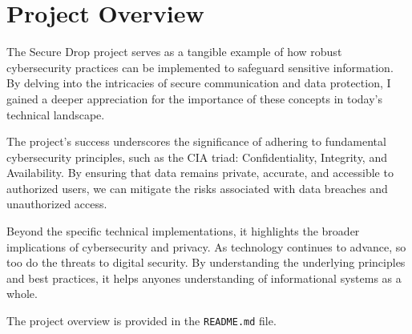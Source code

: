 \documentclass[12pt]{article}
\begin{document}
\newpage

\section{Project Overview}

The Secure Drop project serves as a tangible example of how robust cybersecurity practices can be implemented to safeguard sensitive information. By delving into the intricacies of secure communication and data protection, I gained a deeper appreciation for the importance of these concepts in today's technical landscape.

The project's success underscores the significance of adhering to fundamental cybersecurity principles, such as the CIA triad: Confidentiality, Integrity, and Availability. By ensuring that data remains private, accurate, and accessible to authorized users, we can mitigate the risks associated with data breaches and unauthorized access.

Beyond the specific technical implementations, it highlights the broader implications of cybersecurity and privacy. As technology continues to advance, so too do the threats to digital security. By understanding the underlying principles and best practices, it helps anyones understanding of informational systems as a whole.

The project overview is provided in the \texttt{README.md} file.

\end{document}
